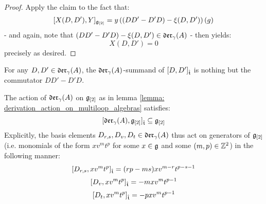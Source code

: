 \begin{proof}
                Apply the claim to the fact that:
                    $$[X(D, D'), Y]_{\mathfrak{g}_{[2]}} = y \left( ( DD' - D'D) - \xi(D, D') \right)( g )$$
                - and again, note that $( DD' - D'D) - \xi(D, D') \in \mathfrak{der}_{\gamma}(A)$ - then yields:
                    $$X(D, D') = 0$$
                precisely as desired. 
            \end{proof}
        \begin{corollary}
            For any $D, D' \in \mathfrak{der}_{\gamma}(A)$, the $\mathfrak{der}_{\gamma}(A)$-summand of $[D, D']_{\hat{\mathfrak{t}}}$ is nothing but the commutator $DD' - D'D$.
        \end{corollary} 
        \begin{corollary} \label{coro: derivation_action_on_multiloop_algebras}
            The action of $\mathfrak{der}_{\gamma}(A)$ on $\mathfrak{g}_{[2]}$ as in lemma \ref{lemma: derivation_action_on_multiloop_algebras} satisfies:
                $$[\mathfrak{der}_{\gamma}(A), \mathfrak{g}_{[2]}]_{\hat{\mathfrak{t}}} \subseteq \mathfrak{g}_{[2]}$$
            Explicitly, the basis elements $D_{r, s}, D_v, D_t \in \mathfrak{der}_{\gamma}(A)$ thus act on generators of $\mathfrak{g}_{[2]}$ (i.e. monomials of the form $x v^m t^p$ for some $x \in \mathfrak{g}$ and some $(m, p) \in \mathbb{Z}^2$) in the following manner:
                $$[D_{r, s}, x v^m t^p]_{\hat{\mathfrak{t}}} = (rp - ms) x v^{m - r} t^{p - s - 1}$$
                $$[D_v, x v^m t^p]_{\hat{\mathfrak{t}}} = -m x v^m t^{p - 1}$$
                $$[D_t, x v^m t^p]_{\hat{\mathfrak{t}}} = -p x v^m t^{p - 1}$$
        \end{corollary}
